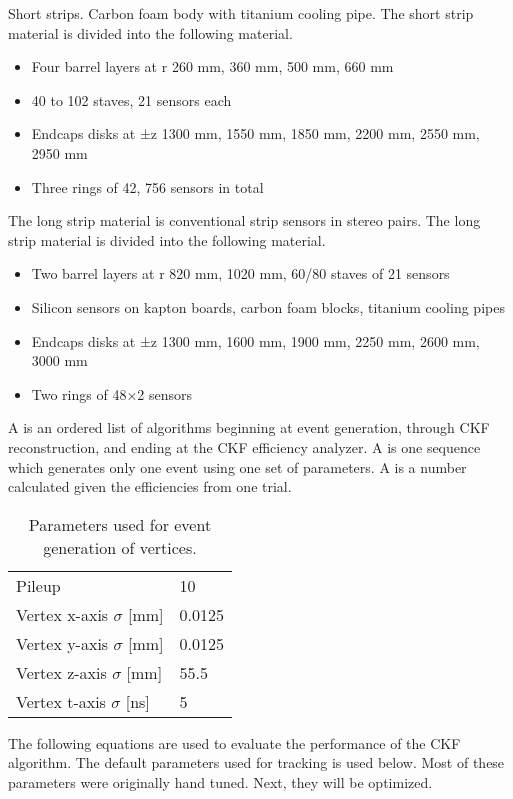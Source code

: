 \documentclass{article}
\newcommand{\figtab}[3]{
\begin{table}[H]
\begin{tabular}{#1}
#2
\end{tabular}
\caption{#3}
\end{table}}
\newcommand{\pt}[0]{p_\textrm{T}}
\begin{document}
Short strips. Carbon foam body with titanium cooling pipe. The short strip material is divided into the following material.

\begin{itemize}
\item Four barrel layers at r 260 mm, 360 mm, 500 mm, 660 mm
\item 40 to 102 staves, 21 sensors each
\item Endcaps disks at ±z 1300 mm, 1550 mm, 1850 mm, 2200 mm, 2550 mm, 2950 mm
\item Three rings of 42, 756 sensors in total
\end{itemize}

The long strip material is conventional strip sensors in stereo pairs. The long strip material is divided into the following material.

\begin{itemize}
\item Two barrel layers at r 820 mm, 1020 mm, 60/80 staves of 21 sensors
\item Silicon sensors on kapton boards, carbon foam blocks, titanium cooling pipes
\item Endcaps disks at ±z 1300 mm, 1600 mm, 1900 mm, 2250 mm, 2600 mm, 3000 mm
\item Two rings of 48×2 sensors
\end{itemize}

A  is an ordered list of algorithms beginning at event generation, through CKF reconstruction, and ending at the CKF efficiency analyzer. A  is one sequence which generates only one event using one set of parameters. A  is a number calculated given the efficiencies from one trial.

\figtab{l l}{Pileup & 10\\
Vertex x-axis $\sigma$ [mm] & 0.0125\\
Vertex y-axis $\sigma$ [mm] & 0.0125\\
Vertex z-axis $\sigma$ [mm] & 55.5\\
Vertex t-axis $\sigma$ [ns] & 5}{Parameters used for event generation of vertices.}


The following equations are used to evaluate the performance of the CKF algorithm. The default parameters used for tracking is used below. Most of these parameters were originally hand tuned. Next, they will be optimized.
\end{document}
